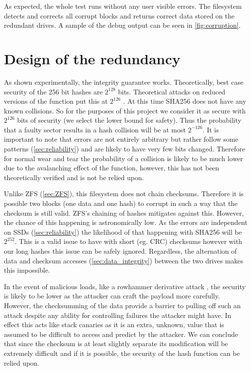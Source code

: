         As expected, the whole test runs without any user visible errors. The
        filesystem detects and corrects all corrupt blocks and returns correct
        data stored on the redundant drives. A sample of the debug output can
        be seen in \autoref{fig:corruption}.

    \section{Design of the redundancy}

        As shown experimentally, the integrity guarantee works. Theoretically,
        best case security of the 256 bit hashes are $2^{128}$ bits.
        Theoretical attacks on reduced versions of the function put this at
        $2^{126}$ \cite{sha2_security, sha2_analysis}. At this time
        SHA256 does not have any known collisions. So for the purposes of this
        project we consider it as secure with $2^{126}$ bits of security (we
        select the lower bound for safety). Thus the probability that a faulty
        sector results in a hash collision will be at most $2^{-126}$. It is
        important to note that errors are not entirely arbitrary but rather
        follow some patterns (\autoref{sec:reliability}) and are likely to have
        very few bits changed. Therefore for normal wear and tear the
        probability of a collision is likely to be much lower due to the
        avalanching effect of the function, however, this has not been
        theoretically verified and is not be relied upon.

        Unlike ZFS (\autoref{sec:ZFS}), this filesystem does not chain checksums.
        Therefore it is possible two blocks (one data and one hash) to corrupt
        in such a way that the checksum is still valid. ZFS's chaining of
        hashes mitigates against this. However, the chance of this happening is
        astronomically low. As the errors are independent on SSDs
        (\autoref{sec:reliability}) the likelihood of that happening with SHA256
        will be $2^{252}$. This is a valid issue to have with short (eg. CRC)
        checksums however with our long hashes this issue can be safely
        ignored. Regardless, the alternation of data and checksum accesses
        (\autoref{sec:data_integrity}) between the two drives makes this
        impossible.

        In the event of malicious loads, like a rowhammer derivative attack
        \cite{ssd_rowhammer}, the security is likely to be lower as the
        attacker can craft the payload more carefully. However, the
        checksumming of the data provide a barrier to pulling off such an
        attack despite any ability for controlling failures the attacker might
        have. In effect this acts like stack canaries \cite{canary} as it is
        an extra, unknown, value that is assumed to be difficult to access and
        predict by the attacker. We can conclude that since the checksum is at
        least slightly separate its modification will be extremely difficult
        and if it is possible, the security of the hash function can be relied
        upon.

